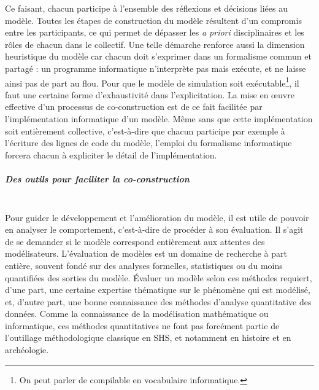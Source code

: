 Ce faisant, chacun participe à l'ensemble des réflexions et décisions liées au modèle.
Toutes les étapes de construction du modèle résultent d'un compromis entre les participants, ce qui permet de dépasser les \textit{a priori} disciplinaires et les \og rôles\fg{} de chacun dans le collectif.
Une telle démarche renforce aussi la dimension heuristique du modèle car chacun doit s'exprimer dans un formalisme commun et partagé :
	un programme informatique n'interprète pas mais exécute, et ne laisse ainsi pas de part au flou.
Pour que le modèle de simulation soit exécutable\footnote{
	On peut parler de \og compilable\fg{} en vocabulaire informatique.
}, il faut une certaine forme d'exhaustivité dans l'explicitation.
La mise en œuvre effective d'un processus de co-construction est de ce fait facilitée par l'implémentation informatique d'un modèle.
Même sans que cette implémentation soit entièrement collective, c'est-à-dire que chacun participe par exemple à l'écriture des lignes de code du modèle, l'emploi du formalisme informatique forcera chacun à expliciter le détail de l'implémentation.

\subparagraph{Des outils pour faciliter la co-construction}~\\

Pour guider le développement et l'amélioration du modèle, il est utile de pouvoir en analyser le comportement, c'est-à-dire de procéder à son évaluation.
Il s'agit de se demander si le modèle correspond entièrement aux attentes des modélisateurs.
L'évaluation de modèles est un domaine de recherche à part entière, souvent fondé sur des analyses formelles, statistiques ou du moins quantifiées des sorties du modèle. 
Évaluer un modèle selon ces méthodes requiert, d'une part, une certaine expertise thématique sur le phénomène qui est modélisé, et, d'autre part, une bonne connaissance des méthodes d'analyse quantitative des données.
Comme la connaissance de la modélisation mathématique ou informatique, ces méthodes quantitatives ne font pas forcément partie de l'outillage méthodologique classique en SHS, et notamment en histoire et en archéologie.


